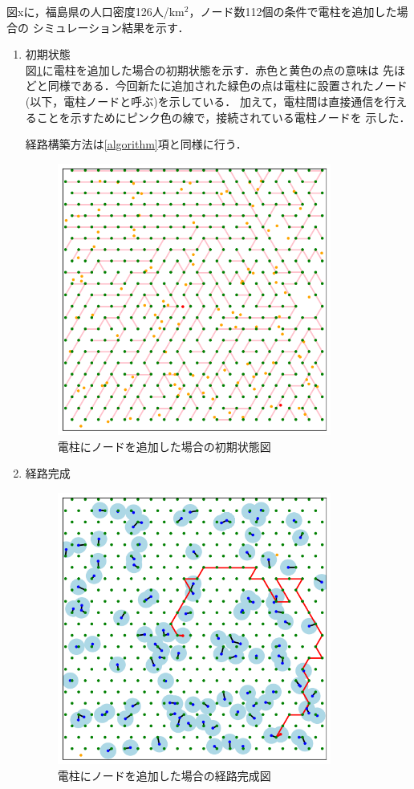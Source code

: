 \documentclass[a4paper, 11pt]{ltjsarticle}
\begin{document}
図xに，福島県の人口密度126人/$\mathrm{km^2}$，ノード数112個の条件で電柱を追加した場合の
シミュレーション結果を示す．
\begin{enumerate}[label=\textbf{(\arabic*)}]
  \item 初期状態 \\
  図\ref{figure:福島_1_step}に電柱を追加した場合の初期状態を示す．赤色と黄色の点の意味は
  先ほどと同様である．今回新たに追加された緑色の点は電柱に設置されたノード(以下，電柱ノードと呼ぶ)を示している．
  加えて，電柱間は直接通信を行えることを示すためにピンク色の線で，接続されている電柱ノードを
  示した．

  経路構築方法は\ref{algorithm}項と同様に行う．
  \clearpage
  \begin{figure}[h]
    \centering
    \includegraphics[width=90mm]{福島_1_step.png}
    \caption{電柱にノードを追加した場合の初期状態図}
    \label{figure:福島_1_step}
  \end{figure}

  \item 経路完成 \\
  \begin{figure}[h]
    \centering
    \includegraphics[width=90mm]{福島_2_step.png}
    \caption{電柱にノードを追加した場合の経路完成図}
    \label{figure:福島_2_step}
  \end{figure}
\end{enumerate}
\end{document}
